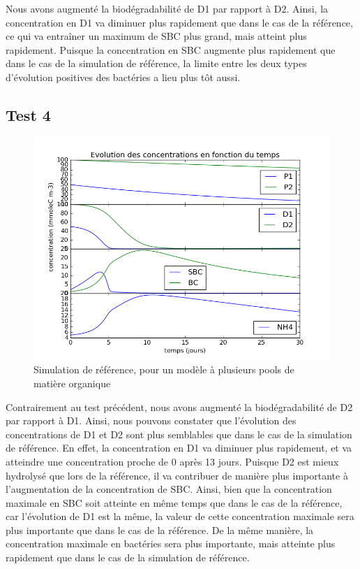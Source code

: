\par{
Nous avons augment\'e la biod\'egradabilit\'e de D1 par rapport \`a D2. Ainsi, la concentration en D1 va diminuer plus rapidement que dans le cas de la r\'ef\'erence, ce qui va entra\^iner un maximum de SBC plus grand, mais atteint plus rapidement. Puisque la concentration en SBC augmente plus rapidement que dans le cas de la simulation de r\'ef\'erence, la limite entre les deux types d'\'evolution positives des bact\'eries a lieu plus t\^ot aussi.
}

\subsection{Test 4}

\par{
\begin{figure}[h!]
  \includegraphics[width=\textwidth]{partie2/Test4.png}
  \caption{Simulation de r\'ef\'erence, pour un mod\`ele \`a plusieurs pools de mati\`ere organique
  }
  \label{fig:partie2test4}
\end{figure}
}
\par{
Contrairement au test pr\'ec\'edent, nous avons augment\'e la biod\'egradabilit\'e de D2 par rapport \`a D1. Ainsi, nous pouvons constater que l'\'evolution des concentrations de D1 et D2 sont plus semblables que dans le cas de la simulation de r\'ef\'erence. En effet, la concentration en D1 va diminuer plus rapidement, et va atteindre une concentration proche de 0 apr\`es 13 jours. Puisque D2 est mieux hydrolys\'e que lors de la r\'ef\'erence, il va contribuer de mani\`ere plus importante \`a l'augmentation de la concentration de SBC. Ainsi, bien que la concentration maximale en SBC soit atteinte en m\^eme temps que dans le cas de la r\'ef\'erence, car l'\'evolution de D1 est la m\^eme, la valeur de cette concentration maximale sera plus importante que dans le cas de la r\'ef\'erence. De la m\^eme mani\`ere, la concentration maximale en bact\'eries sera plus importante, mais atteinte plus rapidement que dans le cas de la simulation de r\'ef\'erence.
}

